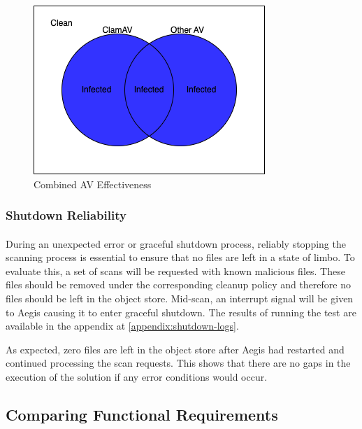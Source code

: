 \documentclass[12pt, conference, final, a4paper, onecolumn, compsoc]{IEEEtran}
\begin{document}
\begin{figure}[H]
  \centering \includegraphics[scale=0.45]{diagrams/scan-union.png}
  \caption{Combined AV Effectiveness}
  \label{scan-union}
\end{figure}


\subsubsection*{Shutdown Reliability}
\paragraph{}
During an unexpected error or graceful shutdown process, reliably stopping the
scanning process is essential to ensure that no files are left in a state of
limbo. To evaluate this, a set of scans will be requested with known malicious
files. These files should be removed under the corresponding cleanup policy and
therefore no files should be left in the object store. Mid-scan, an interrupt
signal will be given to Aegis causing it to enter graceful shutdown. The results
of running the test are available in the appendix at
\ref{appendix:shutdown-logs}.

As expected, zero files are left in the object store after Aegis had restarted
and continued processing the scan requests. This shows that there are no gaps in
the execution of the solution if any error conditions would occur.

\subsection{Comparing Functional Requirements}
\paragraph{}
\end{document}
